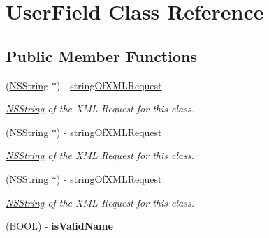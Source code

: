 \hypertarget{interface_user_field}{
\section{UserField Class Reference}
\label{interface_user_field}
}
\subsection*{Public Member Functions}
\begin{DoxyCompactItemize}
\item 
(\hyperlink{class_n_s_string}{NSString} $\ast$) -\/ \hyperlink{interface_user_field_a380d3943e6e1cd691c50c3859715eba2}{stringOfXMLRequest}
\begin{DoxyCompactList}\small\item\em \hyperlink{class_n_s_string}{NSString} of the XML Request for this class. \item\end{DoxyCompactList}\item 
(\hyperlink{class_n_s_string}{NSString} $\ast$) -\/ \hyperlink{interface_user_field_a380d3943e6e1cd691c50c3859715eba2}{stringOfXMLRequest}
\begin{DoxyCompactList}\small\item\em \hyperlink{class_n_s_string}{NSString} of the XML Request for this class. \item\end{DoxyCompactList}\item 
(\hyperlink{class_n_s_string}{NSString} $\ast$) -\/ \hyperlink{interface_user_field_a380d3943e6e1cd691c50c3859715eba2}{stringOfXMLRequest}
\begin{DoxyCompactList}\small\item\em \hyperlink{class_n_s_string}{NSString} of the XML Request for this class. \item\end{DoxyCompactList}\item 
\hypertarget{interface_user_field_a06d50ecc4def805ab79a4fa8d39c9e51}{
(BOOL) -\/ {\bfseries isValidName}}
\label{interface_user_field_a06d50ecc4def805ab79a4fa8d39c9e51}

\end{DoxyCompactItemize}
